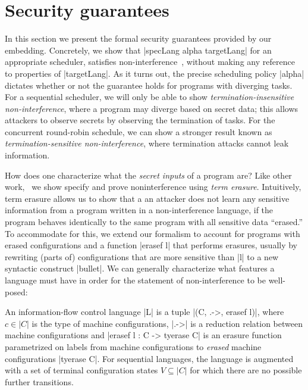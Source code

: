 \section{Security guarantees}
\label{sec:formal}

In this section we present the formal security guarantees provided by
our embedding.
%
Concretely, we show that |specLang alpha targetLang| for an appropriate
scheduler, satisfies non-interference~\tocite{},
without making any reference to properties of |targetLang|.
%
As it turns out, the precise scheduling policy |alpha| dictates
whether or not the guarantee holds for programs with diverging tasks.
For a sequential scheduler, we will only be able to show
\emph{termination-insensitive non-interference}, where a program
may diverge based on secret data; this allows attackers to observe
secrets by observing the termination of tasks.
For the concurrent round-robin schedule,
we can show a stronger result known as
\emph{termination-sensitive non-interference},
where termination attacks cannot leak information.

How does one characterize what the \emph{secret inputs} of a program
are?  Like other work,~\tocite{} we show specify and prove
noninterference using \emph{term erasure}.
%
Intuitively, term erasure allows us to show that a an
attacker does not learn any sensitive information from a program
written in a non-interference language, if the program behaves identically to the
same program with all sensitive data ``erased.''
%
To accommodate for this, we extend our formalism to account for
programs with erased configurations and a function |erasef l| that
performs erasures, usually by rewriting (parts of) configurations that
are more sensitive than |l| to a new syntactic construct |bullet|.
%
We can generally characterize what features a language must have
in order for the statement of non-interference to be well-posed:

\begin{definition}
    An information-flow control language |L| is a tuple |(C, .->,
    erasef l)|, where $c \in |C|$ is the type of machine configurations, |.->| is a
    reduction relation between machine configurations and |erasef l : C -> tyerase C|
    is an erasure function parametrized on labels from machine configurations to \emph{erased} machine
    configurations |tyerase C|.  For sequential languages, the
    language is augmented with a set of terminal configuration states $V
    \subseteq |C|$ for which there are no possible further transitions.
\end{definition}

